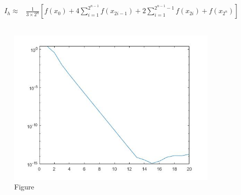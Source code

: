 \documentclass{article}
\begin{document}
    \section{}
        \subsection{}
            \paragraph{}
            \begin{equation*}
                \begin{split}
                    I_h\approx&\frac{1}{3\times2^{n}}[f(x_0)+4\sum_{i=1}^{2^{n-1}}f(x_{2i-1})+2\sum_{i=1}^{2^{n-1}-1}f(x_{2i})+f(x_{2^n})]
                \end{split}
            \end{equation*}
            
            
        \subsection{}
            \begin{figure}[H] 
                \centering 
                \includegraphics[width=0.9\textwidth]{img/Assignement_6_1.jpg}
                \caption{Figure} 
            \end{figure}
\end{document}
